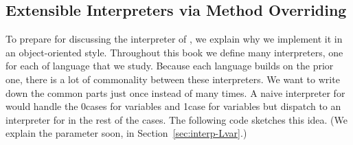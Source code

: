 \documentclass[7x10,nocrop]{TimesAPriori_MIT}%
\def\racketEd{0}
\def\pythonEd{1}
\def\edition{0}
\newcommand{\racket}[1]{{\if\edition\racketEd{#1}\fi}}
\newcommand{\python}[1]{{\if\edition\pythonEd #1\fi}}
\begin{document}
\subsection{Extensible Interpreters via Method Overriding}
\label{sec:extensible-interp}

To prepare for discussing the interpreter of \LangVar{}, we explain
why we implement it in an object-oriented style. Throughout this book
we define many interpreters, one for each of language that we
study. Because each language builds on the prior one, there is a lot
of commonality between these interpreters. We want to write down the
common parts just once instead of many times. A naive 
interpreter for \LangVar{} would handle the
\racket{cases for variables and }
\python{case for variables}
but dispatch to an interpreter for \LangInt{}
in the rest of the cases. The following code sketches this idea. (We
explain the  parameter soon, in
Section~\ref{sec:interp-Lvar}.)
\end{document}
